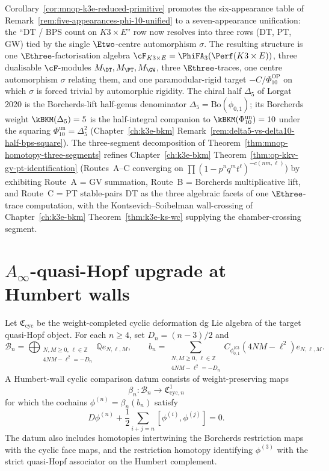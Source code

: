 \begin{remark}
\label{rem:seven-appearance-mnop-unification}
Corollary~\ref{cor:mnop-k3e-reduced-primitive} promotes the six-appearance
table of Remark~\ref{rem:five-appearances-phi-10-unified} to a
seven-appearance unification: the ``DT / BPS count on $K3\times E$''
row now resolves into three rows (DT, PT, GW) tied by the single
$\Etwo$-centre automorphism $\sigma$. The resulting structure is one
$\Ethree$-factorisation algebra
$\cF_{K3\times E} = \PhiFA_3(\Perf(K3\times E))$, three dualisable
$\cF$-modules $M_{\DT}, M_{\PT}, M_{\GW}$, three $\Ethree$-traces, one
centre automorphism $\sigma$ relating them, and one paramodular-rigid
target \(-C/\Phi_{10}^{\mathrm{OP}}\) on which \(\sigma\) is forced trivial by automorphic
rigidity. The chiral half $\Delta_5$ of Lorgat 2020 is the
Borcherds-lift half-genus denominator $\Delta_5 = \mathrm{Bo}(\phi_{0,1})$;
its Borcherds weight $\kBKM(\Delta_5) = 5$ is the half-integral
companion to \(\kBKM(\Phi_{10}^{\mathrm{un}}) = 10\) under the squaring
\(\Phi_{10}^{\mathrm{un}}=\Delta_5^2\) (Chapter~\ref{ch:k3e-bkm}
Remark~\ref{rem:delta5-vs-delta10-half-bps-square}). The three-segment
decomposition of Theorem~\ref{thm:mnop-homotopy-three-segments} refines
Chapter~\ref{ch:k3e-bkm} Theorem~\ref{thm:op-kkv-gv-pt-identification}
(Routes~A--C converging on $\prod (1 - p^n q^m t^\ell)^{-c(nm,\ell)}$)
by exhibiting Route~A = GV summation, Route~B = Borcherds
multiplicative lift, and Route~C = PT stable-pairs DT as the three
algebraic facets of one $\Ethree$-trace computation, with the
Kontsevich--Soibelman wall-crossing of Chapter~\ref{ch:k3e-bkm}
Theorem~\ref{thm:k3e-ks-wc} supplying the chamber-crossing segment.
\end{remark}

\section{\texorpdfstring{$A_\infty$}{A-inf}-quasi-Hopf upgrade at Humbert walls}
\label{sec:A-infty-upgrade}

\begin{definition}
\label{def:kcb-humbert-cyclic-comparison}
Let $\mathfrak C_{\mathrm{cyc}}$ be the weight-completed cyclic
deformation dg Lie algebra of the target quasi-Hopf object.  For each
$n\geq4$, set $D_n=(n-3)/2$ and
 \[
 \mathcal B_n=
 \bigoplus_{\substack{N,M\geq0,\,\ell\in\mathbb Z\\
 4NM-\ell^2=-D_n}}\mathbb Q e_{N,\ell,M},
 \qquad
 b_n=\sum_{\substack{N,M\geq0,\,\ell\in\mathbb Z\\
 4NM-\ell^2=-D_n}}
 C_{\phi^{K3}_{0,1}}(4NM-\ell^2)e_{N,\ell,M}.
\]
A Humbert-wall cyclic comparison datum consists of weight-preserving
maps
\[
 \beta_n:\mathcal B_n\longrightarrow
 \mathfrak C^1_{\mathrm{cyc},n}
\]
for which the cochains $\phi^{(n)}=\beta_n(b_n)$ satisfy
\[
 D\phi^{(n)}+\frac12\sum_{i+j=n}
 [\phi^{(i)},\phi^{(j)}]=0.
\]
The datum also includes homotopies intertwining the Borcherds
restriction maps with the cyclic face maps, and the restriction
homotopy identifying $\phi^{(3)}$ with the strict quasi-Hopf
associator on the Humbert complement.
\end{definition}

